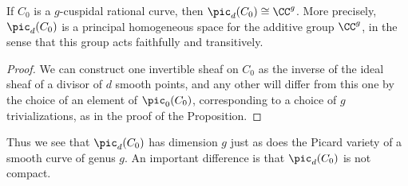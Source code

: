 \begin{corollary}
If $C_{0}$ is a $g$-cuspidal rational curve, then $\pic_{d}(C_{0}) \cong \CC^{g}$. More precisely,
$\pic_{d}(C_{0})$ is a principal homogeneous space for the additive group $\CC^{g}$, in the sense that
this group acts faithfully and transitively.
\end{corollary}
\begin{proof}
We can construct one invertible sheaf on $C_{0}$ as the inverse of the ideal sheaf of a divisor of $d$ smooth points, and any other will differ from this one by the choice of an element of $\pic_{0}(C_{0})$,
corresponding to a choice of $g$ trivializations, as in the proof of the Proposition. \end{proof}

Thus we see that $\pic_{d}(C_{0})$ has dimension $g$ just as does the Picard variety of a smooth curve
of genus $g$. An important difference is that $\pic_{d}(C_{0})$ is not compact.
%
%

 


